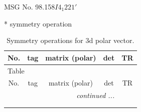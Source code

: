 \documentclass[fleqn,8pt]{jsarticle}
\begin{document}
\setcounter{MaxMatrixCols}{32}

\renewcommand{\tablename}{Table~}
\renewcommand{\figurename}{Figure~}
\begin{center}
\LARGE
MSG No. 98.158\quad$I4_{1}221'$
\end{center}
* symmetry operation
\renewcommand{\arraystretch}{1.3}
\begin{longtable}{ccccc}
\caption{Symmetry operations for 3d polar vector.}
 \\
 \hline \hline
No. & tag & matrix (polar) & det & TR \\ \hline \endfirsthead

\multicolumn{4}{l}{\tablename\ \thetable{}} \\
 \hline \hline
No. & tag & matrix (polar) & det & TR \\ \hline \endhead

 \hline \hline
\multicolumn{4}{r}{\footnotesize\it continued ...} \\ \endfoot

 \hline \hline
\multicolumn{4}{r}{} \\ \endlastfoot


\end{longtable}
\end{document}
